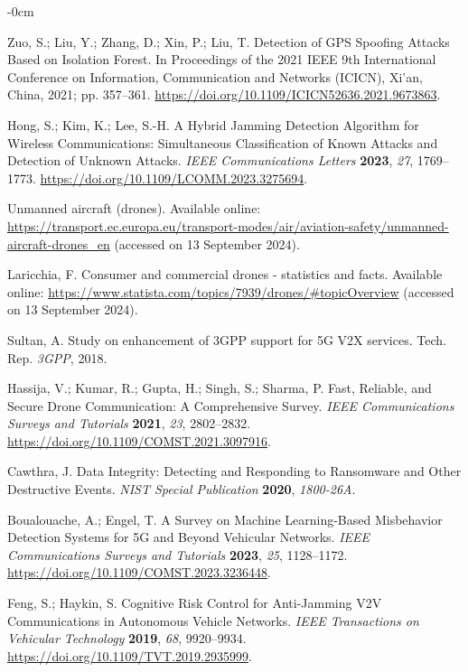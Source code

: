 \documentclass[futureinternet,article,submit,pdftex,moreauthors]{Definitions/mdpi}
\begin{document}
\begin{adjustwidth}{-\extralength}{0cm}
\begin{thebibliography}{999}
Zuo, S.; Liu, Y.; Zhang, D.; Xin, P.; Liu, T. Detection of GPS Spoofing Attacks Based on Isolation Forest. In Proceedings of the 2021 IEEE 9th International Conference on Information, Communication and Networks (ICICN), Xi'an, China, 2021; pp. 357--361. \url{https://doi.org/10.1109/ICICN52636.2021.9673863}.

Hong, S.; Kim, K.; Lee, S.-H. A Hybrid Jamming Detection Algorithm for Wireless Communications: Simultaneous Classification of Known Attacks and Detection of Unknown Attacks. {\em IEEE Communications Letters} {\bf 2023}, {\em 27}, 1769--1773. \url{https://doi.org/10.1109/LCOMM.2023.3275694}.

Unmanned aircraft (drones). Available online: \url{https://transport.ec.europa.eu/transport-modes/air/aviation-safety/unmanned-aircraft-drones_en} (accessed on 13 September 2024).

Laricchia, F. Consumer and commercial drones - statistics and facts. Available online: \url{https://www.statista.com/topics/7939/drones/\#topicOverview} (accessed on 13 September 2024).

Sultan, A. Study on enhancement of 3GPP support for 5G V2X services. Tech. Rep. {\em 3GPP}, 2018.

Hassija, V.; Kumar, R.; Gupta, H.; Singh, S.; Sharma, P. Fast, Reliable, and Secure Drone Communication: A Comprehensive Survey. {\em IEEE Communications Surveys and Tutorials} {\bf 2021}, {\em 23}, 2802--2832. \url{https://doi.org/10.1109/COMST.2021.3097916}.

Cawthra, J. Data Integrity: Detecting and Responding to Ransomware and Other Destructive Events. {\em NIST Special Publication} {\bf 2020}, {\em 1800-26A}.

Boualouache, A.; Engel, T. A Survey on Machine Learning-Based Misbehavior Detection Systems for 5G and Beyond Vehicular Networks. {\em IEEE Communications Surveys and Tutorials} {\bf 2023}, {\em 25}, 1128--1172. \url{https://doi.org/10.1109/COMST.2023.3236448}.

Feng, S.; Haykin, S. Cognitive Risk Control for Anti-Jamming V2V Communications in Autonomous Vehicle Networks. {\em IEEE Transactions on Vehicular Technology} {\bf 2019}, {\em 68}, 9920--9934. \url{https://doi.org/10.1109/TVT.2019.2935999}.


\end{thebibliography}
\end{adjustwidth}
\end{document}
